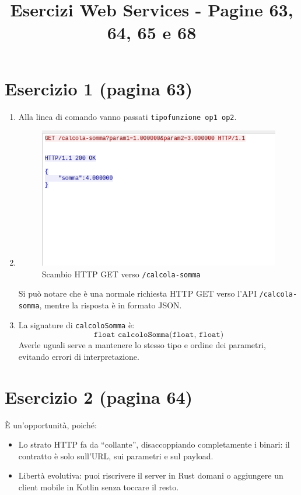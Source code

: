 \documentclass[a4paper,12pt]{article}
\title{Esercizi Web Services - Pagine 63, 64, 65 e 68}
\author{}
\date{}
\begin{document}
\maketitle

\section*{Esercizio 1 (pagina 63)}
\begin{enumerate}
  \item Alla linea di comando vanno passati \texttt{tipofunzione op1 op2}.
  \item
    \begin{figure}[h]
      \centering
      \includegraphics[width=0.6\linewidth]{wireshark.png}
      \caption{Scambio HTTP GET verso \texttt{/calcola-somma}}
    \end{figure}
    Si può notare che è una normale richiesta HTTP GET verso l’API \texttt{/calcola-somma}, mentre la risposta è in formato JSON.
  \item La signature di \texttt{calcoloSomma} è:
    \[
      \texttt{float calcoloSomma(float, float)}
    \]
    Averle uguali serve a mantenere lo stesso tipo e ordine dei parametri, evitando errori di interpretazione.
\end{enumerate}

\section*{Esercizio 2 (pagina 64)}
È un’opportunità, poiché:
\begin{itemize}
  \item Lo strato HTTP fa da “collante”, disaccoppiando completamente i binari: il contratto è solo sull’URL, sui parametri e sul payload.
  \item Libertà evolutiva: puoi riscrivere il server in Rust domani o aggiungere un client mobile in Kotlin senza toccare il resto.
\end{itemize}
\end{document}
